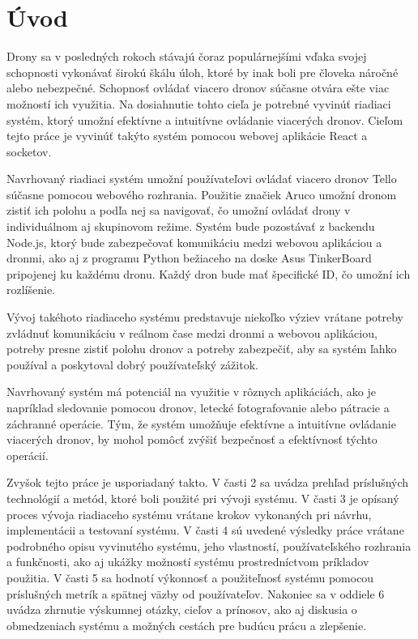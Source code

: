 
\section*{Úvod}
\setcounter{page}{1}
Drony sa v posledných rokoch stávajú čoraz populárnejšími vďaka svojej schopnosti vykonávať širokú škálu úloh, ktoré by inak boli pre človeka náročné alebo nebezpečné. Schopnosť ovládať viacero dronov súčasne otvára ešte viac možností ich využitia. Na dosiahnutie tohto cieľa je potrebné vyvinúť riadiaci systém, ktorý umožní efektívne a intuitívne ovládanie viacerých dronov. Cieľom tejto práce je vyvinúť takýto systém pomocou webovej aplikácie React a socketov.

Navrhovaný riadiaci systém umožní používateľovi ovládať viacero dronov Tello súčasne pomocou webového rozhrania. Použitie značiek Aruco umožní dronom zistiť ich polohu a podľa nej sa navigovať, čo umožní ovládať drony v individuálnom aj skupinovom režime. Systém bude pozostávať z backendu Node.js, ktorý bude zabezpečovať komunikáciu medzi webovou aplikáciou a dronmi, ako aj z programu Python bežiaceho na doske Asus TinkerBoard pripojenej ku každému dronu. Každý dron bude mať špecifické ID, čo umožní ich rozlíšenie.

Vývoj takéhoto riadiaceho systému predstavuje niekoľko výziev vrátane potreby zvládnuť komunikáciu v reálnom čase medzi dronmi a webovou aplikáciou, potreby presne zistiť polohu dronov a potreby zabezpečiť, aby sa systém ľahko používal a poskytoval dobrý používateľský zážitok.

Navrhovaný systém má potenciál na využitie v rôznych aplikáciách, ako je napríklad sledovanie pomocou dronov, letecké fotografovanie alebo pátracie a záchranné operácie. Tým, že systém umožňuje efektívne a intuitívne ovládanie viacerých dronov, by mohol pomôcť zvýšiť bezpečnosť a efektívnosť týchto operácií.

Zvyšok tejto práce je usporiadaný takto. V časti 2 sa uvádza prehľad príslušných technológií a metód, ktoré boli použité pri vývoji systému. V časti 3 je opísaný proces vývoja riadiaceho systému vrátane krokov vykonaných pri návrhu, implementácii a testovaní systému. V časti 4 sú uvedené výsledky práce vrátane podrobného opisu vyvinutého systému, jeho vlastností, používateľského rozhrania a funkčnosti, ako aj ukážky možností systému prostredníctvom príkladov použitia. V časti 5 sa hodnotí výkonnosť a použiteľnosť systému pomocou príslušných metrík a spätnej väzby od používateľov. Nakoniec sa v oddiele 6 uvádza zhrnutie výskumnej otázky, cieľov a prínosov, ako aj diskusia o obmedzeniach systému a možných cestách pre budúcu prácu a zlepšenie.